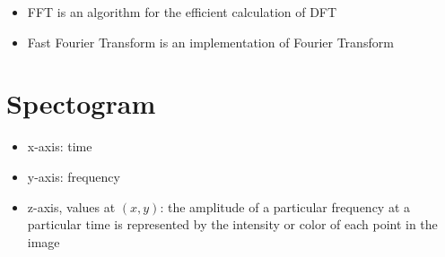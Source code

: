   \begin{itemize}
    \item FFT is an algorithm for the efficient calculation of DFT
    \item Fast Fourier Transform is an implementation of Fourier Transform
  \end{itemize}

\section{Spectogram}

  \begin{itemize}
    \item x-axis: time
    \item y-axis: frequency
    \item z-axis, values at $ \left( x, y \right) $: the amplitude of a
    particular frequency at a particular time is represented by the intensity
    or color of each point in the image
  \end{itemize}
